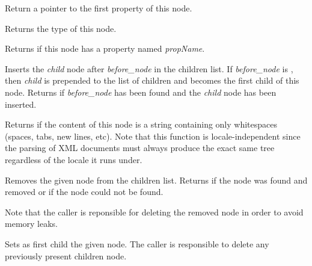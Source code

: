
Return a pointer to the first property of this node.

\label{wxxmlnodegettype}


Returns the type of this node.


\label{wxxmlnodehasprop}


Returns \true if this node has a property named {\it propName}.

\label{wxxmlnodeinsertchild}


Inserts the {\it child} node after {\it before\_node} in the children list.
If {\it before\_node} is \NULL, then {\it child} is prepended to the list of children and
becomes the first child of this node.
Returns \true if {\it before\_node} has been found and the {\it child} node has been inserted.

\label{wxxmlnodecontainsiswhitespaceonly}


Returns \true if the content of this node is a string containing only whitespaces (spaces,
tabs, new lines, etc). Note that this function is locale-independent since the parsing of XML
documents must always produce the exact same tree regardless of the locale it runs under.

\label{wxxmlnoderemovechild}


Removes the given node from the children list. Returns \true if the node was found and removed
or \false if the node could not be found.

Note that the caller is reponsible for deleting the removed node in order to avoid memory leaks.

\label{wxxmlnodesetchildren}


Sets as first child the given node. The caller is responsible to delete any previously present
children node.

